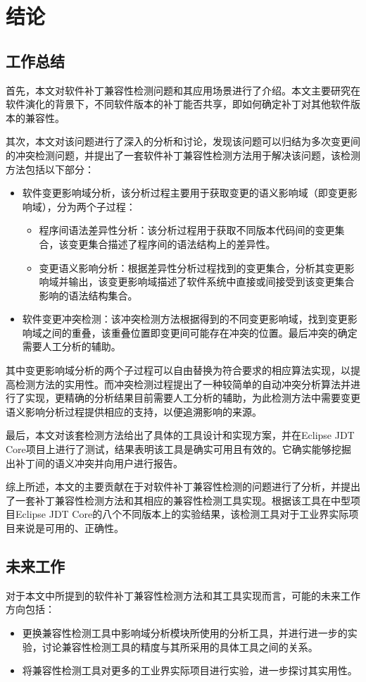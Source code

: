 \chapter{结论}
\section{工作总结}

首先，本文对软件补丁兼容性检测问题和其应用场景进行了介绍。本文主要研究在软件演化的背景下，不同软件版本的补丁能否共享，即如何确定补丁对其他软件版本的兼容性。

其次，本文对该问题进行了深入的分析和讨论，发现该问题可以归结为多次变更间的冲突检测问题，并提出了一套软件补丁兼容性检测方法用于解决该问题，该检测方法包括以下部分：
\begin{itemize}
	\item 软件变更影响域分析，该分析过程主要用于获取变更的语义影响域（即变更影响域），分为两个子过程：
	\begin{itemize}
		\item 程序间语法差异性分析：该分析过程用于获取不同版本代码间的变更集合，该变更集合描述了程序间的语法结构上的差异性。
		\item 变更语义影响分析：根据差异性分析过程找到的变更集合，分析其变更影响域并输出，该变更影响域描述了软件系统中直接或间接受到该变更集合影响的语法结构集合。
	\end{itemize}
	\item 软件变更冲突检测：该冲突检测方法根据得到的不同变更影响域，找到变更影响域之间的重叠，该重叠位置即变更间可能存在冲突的位置。最后冲突的确定需要人工分析的辅助。
\end{itemize}

其中变更影响域分析的两个子过程可以自由替换为符合要求的相应算法实现，以提高检测方法的实用性。而冲突检测过程提出了一种较简单的自动冲突分析算法并进行了实现，更精确的分析结果目前需要人工分析的辅助，为此检测方法中需要变更语义影响分析过程提供相应的支持，以便追溯影响的来源。

最后，本文对该套检测方法给出了具体的工具设计和实现方案，并在Eclipse JDT Core项目上进行了测试，结果表明该工具是确实可用且有效的。它确实能够挖掘出补丁间的语义冲突并向用户进行报告。

综上所述，本文的主要贡献在于对软件补丁兼容性检测的问题进行了分析，并提出了一套补丁兼容性检测方法和其相应的兼容性检测工具实现。根据该工具在中型项目Eclipse JDT Core的八个不同版本上的实验结果，该检测工具对于工业界实际项目来说是可用的、正确性。

\section{未来工作}

对于本文中所提到的软件补丁兼容性检测方法和其工具实现而言，可能的未来工作方向包括：
\begin{itemize}
	\item 更换兼容性检测工具中影响域分析模块所使用的分析工具，并进行进一步的实验，讨论兼容性检测工具的精度与其所采用的具体工具之间的关系。
	\item 将兼容性检测工具对更多的工业界实际项目进行实验，进一步探讨其实用性。
\end{itemize}